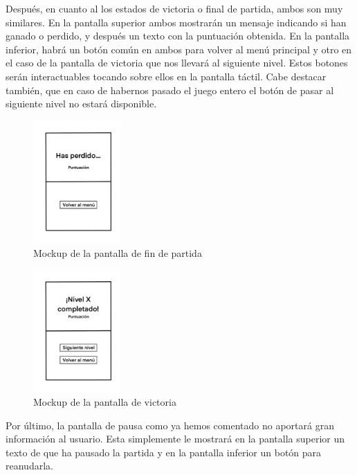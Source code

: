 Después, en cuanto al los estados de victoria o final de partida, ambos son muy similares. En la pantalla superior ambos mostrarán un mensaje indicando si han ganado o perdido, y después un texto con la puntuación obtenida. En la pantalla inferior, habrá un botón común en ambos para volver al menú principal y otro en el caso de la pantalla de victoria que nos llevará al siguiente nivel. Estos botones serán interactuables tocando sobre ellos en la pantalla táctil. Cabe destacar también, que en caso de habernos pasado el juego entero el botón de pasar al siguiente nivel no estará disponible.

\clearpage
 
    \begin{figure}[htbp]
\centering
  \includegraphics[width=0.3\textwidth]{archivos/mockup_gameover.png}
  \caption{Mockup de la pantalla de fin de partida}
  \label{fig:mockup_gameover}
\end{figure}

   \begin{figure}[htbp]
\centering
  \includegraphics[width=0.3\textwidth]{archivos/mockup_win.png}
  \caption{Mockup de la pantalla de victoria}
  \label{fig:mockup_win}
\end{figure}

Por último, la pantalla de pausa como ya hemos comentado no aportará gran información al usuario. Esta simplemente le mostrará en la pantalla superior un texto de que ha pausado la partida y en la pantalla inferior un botón para reanudarla.

